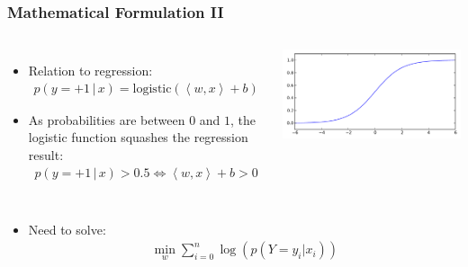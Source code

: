 \begin{frame}
    \frametitle{Mathematical Formulation II}
    \begin{columns}[T]
            \begin{itemize}
                \item Relation to regression:
                    \begin{align*}
                        p(y=+1\,|\, x) = \text{logistic}(\left<w, x\right> + b)
                    \end{align*}
                \item As probabilities are between $0$ and $1$, the logistic function
                    squashes the regression result:
                    \begin{align*}
                         p(y=+1 \,|\, x) > 0.5 \Leftrightarrow \left <w, x \right> + b > 0
                     \end{align*}
            \end{itemize}
            \includegraphics[width=.8\linewidth]{logreg-pics/logistic_sigmoid}\\
    \end{columns}
    \begin{itemize}
        \item Need to solve:
            \begin{align*}
                \min_w \sum_{i=0}^n \log(p(Y=y_i | x_i))
            \end{align*}
    \end{itemize}
\end{frame}


